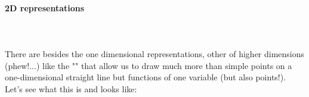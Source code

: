 	\paragraph{2D representations}\mbox{}\\\\
	There are besides the one dimensional representations, other of higher dimensions (phew!...) like the "" that allow us to draw much more than simple points on a one-dimensional straight line but functions of one variable (but also points!). Let's see what this is and looks like:
	\begin{figure}[H]
		\centering
		\begin{tikzpicture}[x=0.75pt,y=0.75pt,yscale=-1,xscale=1]
		

\end{tikzpicture}
\end{figure}
